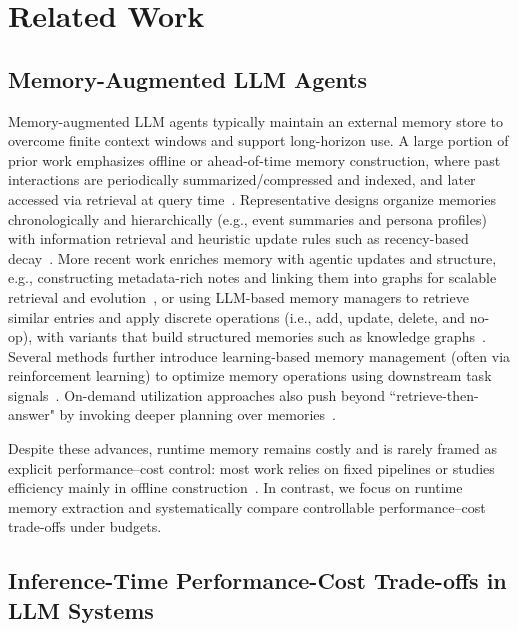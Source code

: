 \section{Related Work}
\label{sec:related}



\subsection{Memory-Augmented LLM Agents}


Memory-augmented LLM agents typically maintain an external memory store to overcome finite context windows and support long-horizon use. A large portion of prior work emphasizes offline or ahead-of-time memory construction, where past interactions are periodically summarized/compressed and indexed, and later accessed via retrieval at query time~\citep{zhong2024memorybank, packer2023memgpt, lee2024human, kang2025memory, fang2025lightmem}. Representative designs organize memories chronologically and hierarchically (e.g., event summaries and persona profiles) with information retrieval and heuristic update rules such as recency-based decay~\citep{zhong2024memorybank, kang2025memory}. 
More recent work enriches memory with agentic updates and structure, e.g., constructing metadata-rich notes and linking them into graphs for scalable retrieval and evolution~\citep{xu2025mem}, or using LLM-based memory managers to retrieve similar entries and apply discrete operations (i.e., add, update, delete, and no-op), with variants that build structured memories such as knowledge graphs~\citep{chhikara2025mem0}. Several methods further introduce learning-based memory management (often via reinforcement learning) to optimize memory operations using downstream task signals~\citep{yan2025memory, wang2025mem}. On-demand utilization approaches also push beyond ``retrieve-then-answer" by invoking deeper planning over memories~\citep{yan2025general}. 



Despite these advances, runtime memory remains costly and is rarely framed as explicit performance--cost control: most work relies on fixed pipelines or studies efficiency mainly in offline construction~\citep{fang2025lightmem}. In contrast, we focus on runtime memory extraction and systematically compare controllable performance--cost trade-offs under budgets.




\subsection{Inference-Time Performance-Cost Trade-offs in LLM Systems}
\label{sec:related_tradeoff}


